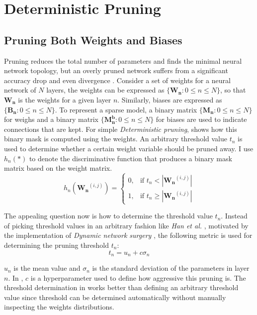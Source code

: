 \documentclass[a4paper,12pt]{report}
\begin{document}
\section{Deterministic Pruning}
\subsection{Pruning Both Weights and Biases}
\label{sec:prune_without_biase}
Pruning reduces the total number of parameters and finds the minimal
neural network topology, but an overly pruned network suffers from a significant
accuracy drop and even divergence \cite{Thimm}.
Consider a set of weights for a neural network of $N$ layers,
the weights can be expressed as $\{\mathbf{W_n} : 0 \leq n \leq N \}$, so that $\mathbf{W_n}$ is the
weights for a given layer $n$.
Similarly, biases are expressed as $\{\mathbf{B_n} : 0 \leq n \leq N \}$.
To represent a sparse model, a binary matrix
$\{\mathbf{M_n}: 0 \leq n \leq N\}$ for weighs and a binary
matrix $\{\mathbf{M^b_n}: 0 \leq n \leq N\}$ for biases are used to indicate connections that are kept.
For simple \textit{Deterministic pruning},  shows how this binary mask
is computed using the weights.
An arbitrary threshold value $t_n$ is used to determine whether a certain weight
variable should be pruned away.
I use $h_n(*)$ to denote the discriminative function that produces a binary mask
matrix based on the weight matrix.
\begin{equation}
  h_n(\mathbf{W_n}^{(i,j)}) =
  \begin{cases}
    0, &\text{if } t_n < |\mathbf{W_n}^{(i,j)}| \\
    1, &\text{if } t_n \geq |\mathbf{W_n}^{(i,j)}|
  \end{cases}
  \label{equ:hfunc}
\end{equation}

The appealing question now is how to determine the threshold value $t_n$.
Instead of picking threshold values in an arbitrary fashion \cite{Han} like \textit{Han et al.} , motivated by the
implementation of \textit{Dynamic network surgery} \cite{Guo}, the
following metric is used for determining the pruning threshold $t_n$:
\begin{equation}
  t_n = u_n + c \sigma_n
  \label{equ:tn}
\end{equation}

$u_n$ is the mean value and
$\sigma_n$ is the standard deviation of the parameters in layer $n$.
In , $c$ is a hyperparameter used to define how aggressive this
pruning is.
The threshold determination in  works better than defining an arbitrary threshold
value since threshold can be determined automatically without manually inspecting the weights
distributions.
\end{document}
